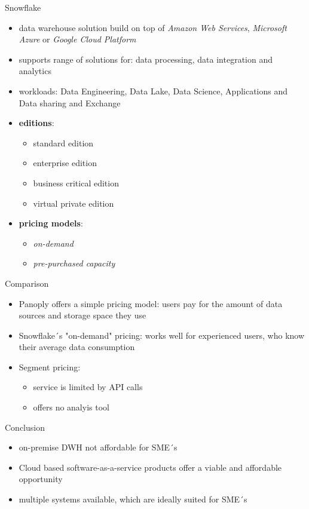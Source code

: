 \documentclass[aspectratio=169]{beamer}
\begin{document}
  \begin{frame}{Snowflake}
    \begin{itemize}
      \item data warehouse solution build on top of \textit{Amazon Web Services}, \textit{Microsoft Azure} or \textit{Google Cloud Platform}
      \item supports range of solutions for: data processing, data integration and analytics
      \item workloads: Data Engineering, Data Lake, Data Science, Applications and Data sharing and Exchange
      \item \textbf{editions}:
      \begin{itemize}
        \item standard edition
        \item enterprise edition
        \item business critical edition
        \item virtual private edition
      \end{itemize}
      \item  \textbf{pricing models}:
      \begin{itemize}
        \item \textit{on-demand}
        \item \textit{pre-purchased capacity}
      \end{itemize}
    \end{itemize}
  \end{frame}

  \begin{frame}{Comparison}
    \begin{itemize}
      \item Panoply offers a simple pricing model: users pay for the amount of data sources and storage space they use
      \item Snowflake´s "on-demand" pricing: works well for experienced users, who know their average data consumption
      \item Segment pricing:
      \begin{itemize}
        \item service is limited by API calls
        \item offers no analyis tool
      \end{itemize}
    \end{itemize}
  \end{frame}

  \begin{frame}{Conclusion}
    \begin{itemize}
      \item on-premise DWH not affordable for SME´s
      \item Cloud based software-as-a-service products offer a viable and affordable opportunity
      \item multiple systems available, which are ideally suited for SME´s
    \end{itemize}
  \end{frame}
\end{document}
